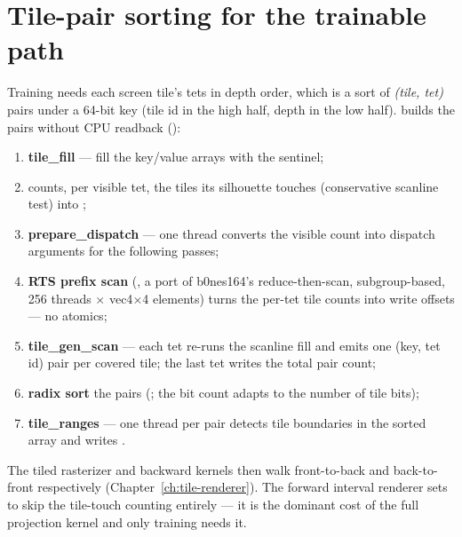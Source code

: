 \section{Tile-pair sorting for the trainable path}

Training needs each screen tile's tets in depth order, which is a sort of
\emph{(tile, tet)} pairs under a 64-bit key (tile id in the high half, depth
in the low half).  builds the pairs without CPU readback
():

\begin{enumerate}
\item \textbf{tile\_fill} --- fill the key/value arrays with the
   sentinel;
\item {} counts, per visible tet, the tiles its
  silhouette touches (conservative scanline test) into
  ;
\item \textbf{prepare\_dispatch} --- one thread converts the visible count
  into dispatch arguments for the following passes;
\item \textbf{RTS prefix scan} (, a port of b0nes164's
  reduce-then-scan, subgroup-based, 256 threads $\times$ vec4$\times$4
  elements) turns the per-tet tile counts into write offsets --- no atomics;
\item \textbf{tile\_gen\_scan} --- each tet re-runs the scanline fill and
  emits one (key, tet id) pair per covered tile; the last tet writes the
  total pair count;
\item \textbf{radix sort} the pairs (; the bit count
  adapts to the number of tile bits);
\item \textbf{tile\_ranges} --- one thread per pair detects tile boundaries
  in the sorted array and writes \code{tile_ranges[tile] = [start, end)}.
\end{enumerate}

The tiled rasterizer and backward kernels then walk 
front-to-back and back-to-front respectively (Chapter~\ref{ch:tile-renderer}).
The forward interval renderer sets  to skip the
tile-touch counting entirely --- it is the dominant cost of the full
projection kernel and only training needs it.

